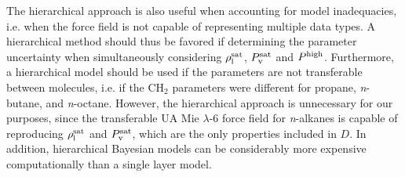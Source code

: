 \documentclass[journal=jctc,manuscript=article]{achemso}
\begin{document}
The hierarchical approach is also useful when accounting for model inadequacies, i.e. when the force field is not capable of representing multiple data types. A hierarchical method should thus be favored if determining the parameter uncertainty when simultaneously considering $\rho_{\rm l}^{\rm sat}$, $P_{\rm v}^{\rm sat}$ and $P^{\rm high}$. Furthermore, a hierarchical model should be used if the parameters are not transferable between molecules, i.e. if the CH$_2$ parameters were different for propane, \textit{n}-butane, and \textit{n}-octane. However, the hierarchical approach is unnecessary for our purposes, since the transferable UA Mie $\lambda$-6 force field for \textit{n}-alkanes is capable of reproducing $\rho_{\rm l}^{\rm sat}$ and $P_{\rm v}^{\rm sat}$, which are the only properties included in $D$. In addition, hierarchical Bayesian models can be considerably more expensive computationally than a single layer model.





\end{document}
